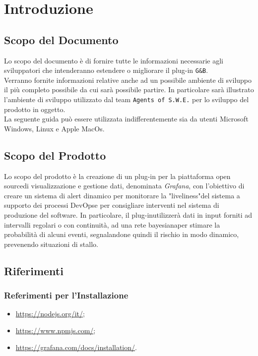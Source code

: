 \section{Introduzione}\label{Intro}
\subsection{Scopo del Documento}
Lo scopo del documento è di fornire tutte le informazioni necessarie agli sviluppatori che intenderanno estendere o migliorare il plug-in \texttt{G\&B}.\\
Verranno fornite informazioni relative anche ad un possibile ambiente di sviluppo il più completo possibile da cui sarà possibile partire. In particolare sarà illustrato l'ambiente di sviluppo utilizzato dal team \texttt{Agents of S.W.E.} per lo sviluppo del prodotto in oggetto.\\
La seguente guida può essere utilizzata indifferentemente sia da utenti Microsoft Windows, Linux e Apple MacOs.


\subsection{Scopo del Prodotto}
Lo scopo del prodotto è la creazione di un plug-in per la piattaforma open source\glossario di visualizzazione e gestione dati, denominata \textit{Grafana}\glossario , con l’obiettivo di creare un sistema di alert dinamico per monitorare la "liveliness"\glossario del sistema a supporto dei processi DevOps\glossario e per consigliare interventi nel sistema di produzione del software.
In particolare, il plug-in\glossario utilizzerà dati in input forniti ad intervalli regolari o con continuità, ad una rete bayesiana\glossario per stimare la probabilità di alcuni eventi, segnalandone quindi il rischio in modo dinamico, prevenendo situazioni di stallo.


\subsection{Riferimenti}\label{Riferimenti}
\subsubsection{Referimenti per l'Installazione}
\begin{itemize}
	\item \url{https://nodejs.org/it/};
	\item \url{https://www.npmjs.com/};
	\item \url{https://grafana.com/docs/installation/}.
\end{itemize}

